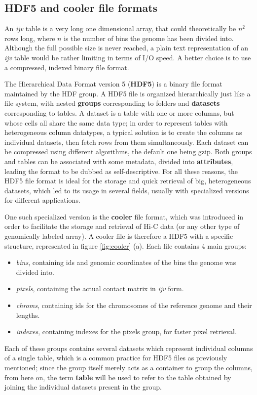 \subsection{HDF5 and cooler file formats}
An \emph{ijv} table is a very long one dimensional array, that could theoretically be $n^2$ rows long, where $n$ is the number of bins the genome has been divided into. Although the full possible size is never reached, a plain text representation of an \emph{ijv} table would be rather limiting in terms of I/O speed. A better choice is to use a compressed, indexed binary file format. 

The Hierarchical Data Format version 5 (\textbf{HDF5}) is a binary file format maintained by the HDF group\cite{hdfgroup}. A HDF5 file is organized hierarchically just like a file system, with nested \textbf{groups} corresponding to folders and \textbf{datasets} corresponding to tables. A dataset is a table with one or more columns, but whose cells all share the same data type; in order to represent tables with heterogeneous column datatypes, a typical solution is to create the columns as individual datasets, then fetch rows from them simultaneously. Each dataset can be compressed using different algorithms, the default one being gzip. Both groups and tables can be associated with some metadata, divided into \textbf{attributes}, leading the format to be dubbed as self-descriptive. For all these reasons, the HDF5 file format is ideal for the storage and quick retrieval of big, heterogeneous datasets, which led to its usage in several fields, usually with specialized versions for different applications.

One such specialized version is the \textbf{cooler} file format, which was introduced in order to facilitate the storage and retrieval of Hi-C data (or any other type of genomically labeled array)\cite{cooler2020}. A cooler file is therefore a HDF5 with a specific structure, represented in figure \ref{fig:cooler} (a). Each file contains 4 main groups:
\begin{itemize}\tightlist
  \item \emph{bins}, containing ids and genomic coordinates of the bins the genome was divided into.
  \item \emph{pixels}, containing the actual contact matrix in \emph{ijv} form.
  \item \emph{chroms}, containing ids for the chromosomes of the reference genome and their lengths.
  \item \emph{indexes}, containing indexes for the pixels group, for faster pixel retrieval.
\end{itemize}
Each of these groups contains several datasets which represent individual columns of a single table, which is a common practice for HDF5 files as previously mentioned; since the group itself merely acts as a container to group the columns, from here on, the term \textbf{table} will be used to refer to the table obtained by joining the individual datasets present in the group.

